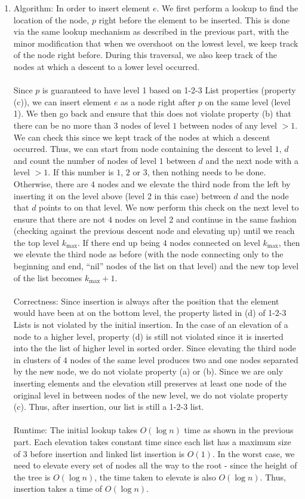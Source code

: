 \documentclass{article}
\theoremstyle{casestyle}
\begin{document}
\begin{enumerate}[i]
\begin{enumerate}[i]
  \item Algorithm: In order to insert element $e$. We first perform a lookup to find the location of the node, $p$ right before the element to be inserted. This is done via the same lookup mechanism as described in the previous part, with the minor modification that when we overshoot on the lowest level, we keep track of the node right before. During this traversal, we also keep track of the nodes at which a descent to a lower level occurred. \\\\ Since $p$ is guaranteed to have level 1 based on 1-2-3 List properties (property (c)), we can insert element $e$ as a node right after $p$ on the same level (level 1). We then go back and ensure that this does not violate property (b) that there can be no more than $3$ nodes of level $1$ between nodes of any level $>1$. We can check this since we kept track of the nodes at which a descent occurred. Thus, we can start from node containing the descent to level $1$, $d$ and count the number of nodes of level $1$ between $d$ and the next node with a level $>1$. If this number is $1$, $2$ or $3$, then nothing needs to be done. Otherwise, there are $4$ nodes and we elevate the third node from the left by inserting it on the level above (level 2 in this case) between $d$ and the node that $d$ points to on that level. We now perform this check on the next level to ensure that there are not $4$ nodes on level 2 and continue in the same fashion (checking against the previous descent node and elevating up) until we reach the top level $k_{\max}$. If there end up being $4$ nodes connected on level $k_{\max}$, then we elevate the third node as before (with the node connecting only to the beginning and end, ``nil'' nodes of the list on that level) and the new top level of the list becomes $k_{\max}+1$.
    \\\\ Correctness: Since insertion is always after the position that the element would have been at on the bottom level, the property listed in (d) of 1-2-3 Lists is not violated by the initial insertion. In the case of an elevation of a node to a higher level, property (d) is still not violated since it is inserted into the the list of higher level in sorted order. Since elevating the third node in clusters of $4$ nodes of the same level produces two and one nodes separated by the new node, we do not violate property (a) or (b). Since we are only inserting elements and the elevation still preserves at least one node of the original level in between nodes of the new level, we do not violate property (c). Thus, after insertion, our list is still a 1-2-3 list.
    \\\\ Runtime: The initial lookup takes $O(\log n)$ time as shown in the previous part. Each elevation takes constant time since each list has a maximum size of $3$ before insertion and linked list insertion is $O(1)$. In the worst case, we need to elevate every set of nodes all the way to the root - since the height of the tree is $O(\log n)$, the time taken to elevate is also $O(\log n)$. Thus, insertion takes a time of $O(\log n)$.


\end{enumerate}
\end{enumerate}
\end{document}
